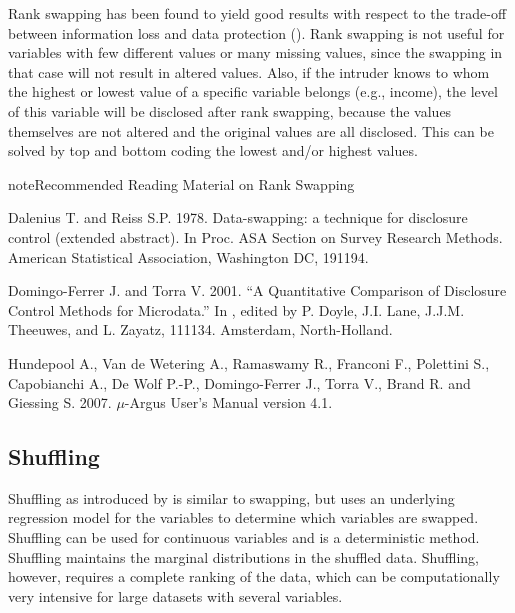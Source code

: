 \documentclass[letterpaper,10pt,english]{sphinxmanual}
\begin{document}
Rank swapping has been found to yield good results with respect to the
trade-off between information loss and data protection ({\hyperref[\detokenize{anon_methods:doto01a}]{}}).
Rank swapping is not useful for variables with few
different values or many missing values, since the swapping in that case
will not result in altered values. Also, if the intruder knows to whom
the highest or lowest value of a specific variable belongs (e.g.,
income), the level of this variable will be disclosed after rank
swapping, because the values themselves are not altered and the original
values are all disclosed. This can be solved by top and bottom coding
the lowest and/or highest values.

\begin{sphinxadmonition}{note}{Recommended Reading Material on Rank Swapping}

Dalenius T. and Reiss S.P. 1978. Data-swapping: a technique for
disclosure control (extended abstract). In Proc. ASA Section on Survey
Research Methods. American Statistical Association, Washington DC,
191\textendash{}194.

Domingo-Ferrer J. and Torra V. 2001. “A Quantitative Comparison of
Disclosure Control Methods for Microdata.” In , edited by P. Doyle, J.I. Lane, J.J.M. Theeuwes,
and L. Zayatz, 111\textendash{}134. Amsterdam, North-Holland.

Hundepool A., Van de Wetering A., Ramaswamy R., Franconi F., Polettini
S., Capobianchi A., De Wolf P.-P., Domingo-Ferrer J., Torra V., Brand R.
and Giessing S. 2007. \(\mu\)-Argus User’s Manual version 4.1.
\end{sphinxadmonition}


\subsection{Shuffling}
\label{\detokenize{anon_methods:shuffling}}
Shuffling as introduced by {\hyperref[\detokenize{anon_methods:musa06}]{}} is similar to
swapping, but uses an underlying regression model for the variables to
determine which variables are swapped. Shuffling can be used for
continuous variables and is a deterministic method. Shuffling maintains
the marginal distributions in the shuffled data. Shuffling, however,
requires a complete ranking of the data, which can be computationally
very intensive for large datasets with several variables.
\end{document}
